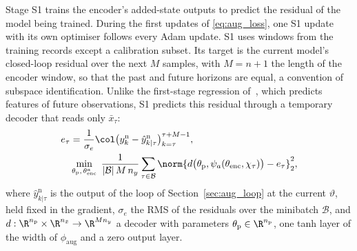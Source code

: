 Stage S1 trains the encoder's added-state outputs to predict the residual of
the model being trained.
During the first updates of \eqref{eq:aug_loss}, one S1 update with its own
optimiser follows every Adam update.
S1 uses windows from the training records except a calibration subset.
Its target is the current model's closed-loop residual over the next $M$
samples, with $M=n+1$ the length of the encoder window, so that the past and
future horizons are equal, a convention of subspace identification.
Unlike the first-stage regression of~\cite{hefny2015supervised}, which
predicts features of future observations, S1 predicts this residual through a
temporary decoder that reads only $\bar x_\tau$:
\begin{equation}
\begin{aligned}
 e_\tau&=\frac{1}{\sigma_e}\col\bigl(y^{\mathrm n}_{k}-\hat y^{\mathrm n}_{k|\tau}\bigr)_{k=\tau}^{\tau+M-1},\\
 &\min_{\theta_{\mathrm p},\,\theta^a_{\mathrm{enc}}}\;
 \frac{1}{|\mathcal B|\,M\,n_y}\sum_{\tau\in\mathcal B}
 \norm{d\bigl(\theta_{\mathrm p},\psi_a(\theta_{\mathrm{enc}},\chi_\tau)\bigr)-e_\tau}_2^2,
\end{aligned}
\label{eq:ps2_s1}
\end{equation}
where $\hat y^{\mathrm n}_{k|\tau}$ is the output of the loop of
Section~\ref{sec:aug_loop} at the current $\vartheta$, held fixed in the
gradient, $\sigma_e$ the RMS of the residuals over the minibatch
$\mathcal B$, and
$d:\R^{n_{\mathrm p}}\times\R^{n_{\bar x}}\to\R^{Mn_y}$ a decoder with
parameters $\theta_{\mathrm p}\in\R^{n_{\mathrm p}}$, one tanh layer of the
width of $\phi_{\mathrm{aug}}$ and a zero output layer.

